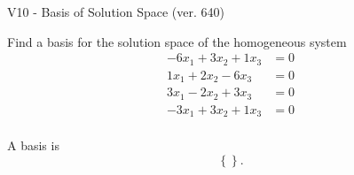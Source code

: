 \begin{exercise}
  \begin{exerciseTitle}V10 - Basis of Solution Space (ver. 640)\end{exerciseTitle}
  \begin{exerciseStatement}
    Find a basis for the solution space of the homogeneous system 
\begin{align*}
 -6 x_ 1 + 3 x_ 2 + 1 x_ 3 &= 0  \\ 
  1 x_ 1 + 2 x_ 2 -6 x_ 3 &= 0  \\ 
  3 x_ 1 -2 x_ 2 + 3 x_ 3 &= 0  \\ 
  -3 x_ 1 + 3 x_ 2 + 1 x_ 3 &= 0  \\ 
 \end{align*}


 
  \end{exerciseStatement}

  \begin{exerciseAnswer}
   A basis is   
\[\left\{\right\}.\]

  


  \end{exerciseAnswer}
\end{exercise}